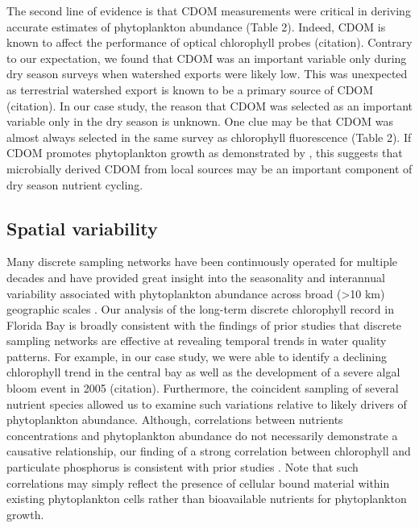 \documentclass[review]{elsarticle}
\begin{document}
The second line of evidence is that CDOM measurements were critical in deriving accurate estimates of phytoplankton abundance (Table 2). Indeed, CDOM is known to affect the performance of optical chlorophyll probes (citation). Contrary to our expectation, we found that CDOM was an important variable only during dry season surveys when watershed exports were likely low. This was unexpected as terrestrial watershed export is known to be a primary source of CDOM (citation). In our case study, the reason that CDOM was selected as an important variable only in the dry season is unknown. One clue may be that CDOM was almost always selected in the same survey as chlorophyll fluorescence (Table 2). If CDOM promotes phytoplankton growth as demonstrated by \citet{traving2017effect}, this suggests that microbially derived CDOM from local sources may be an important component of dry season nutrient cycling.

\subsection{Spatial variability}

Many discrete sampling networks have been continuously operated for multiple decades and have provided great insight into the seasonality and interannual variability associated with phytoplankton abundance across broad (>10 km) geographic scales \citep{cloern_patterns_2010}. Our analysis of the long-term discrete chlorophyll record in Florida Bay is broadly consistent with the findings of prior studies that discrete sampling networks are effective at revealing temporal trends in water quality patterns. For example, in our case study, we were able to identify a declining chlorophyll trend in the central bay as well as the development of a severe algal bloom event in 2005 (citation). Furthermore, the coincident sampling of several nutrient species allowed us to examine such variations relative to likely drivers of phytoplankton abundance. Although, correlations between nutrients concentrations and phytoplankton abundance do not necessarily demonstrate a causative relationship, our finding of a strong correlation between chlorophyll and particulate phosphorus is consistent with prior studies \citep[Table 1;][]{fourqurean1993process}. Note that such correlations may simply reflect the presence of cellular bound material within existing phytoplankton cells rather than bioavailable nutrients for phytoplankton growth. 
\end{document}
